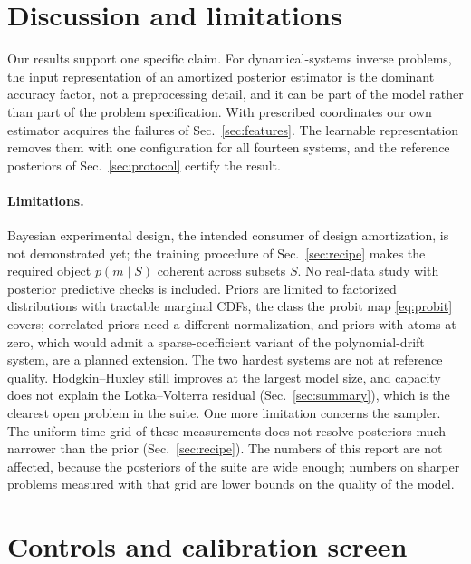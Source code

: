 \documentclass[10pt]{article}
\begin{document}
\section{Discussion and limitations}
\label{sec:discussion}

Our results support one specific claim. For dynamical-systems inverse problems, the input
representation of an amortized posterior estimator is the dominant accuracy factor, not a
preprocessing detail, and it can be part of the model rather than part of the problem specification.
With prescribed coordinates our own estimator acquires the failures of Sec.~\ref{sec:features}. The
learnable representation removes them with one configuration for all fourteen systems, and the
reference posteriors of Sec.~\ref{sec:protocol} certify the result.

\paragraph{Limitations.} Bayesian experimental design, the intended consumer of design amortization,
is not demonstrated yet; the training procedure of Sec.~\ref{sec:recipe} makes the required object
$p(m \mid S)$ coherent across subsets $S$. No real-data study with posterior predictive checks is
included. Priors are limited to factorized distributions with tractable marginal CDFs, the class the
probit map \eqref{eq:probit} covers; correlated priors need a different normalization, and priors with
atoms at zero, which would admit a sparse-coefficient variant of the polynomial-drift system, are a
planned extension. The two hardest systems are not at reference quality. Hodgkin--Huxley still
improves at the largest model size, and capacity does not explain the Lotka--Volterra residual
(Sec.~\ref{sec:summary}), which is the clearest open problem in the suite. One more limitation
concerns the sampler. The uniform time grid of these measurements does not resolve posteriors much
narrower than the prior (Sec.~\ref{sec:recipe}). The numbers of this report are not affected, because
the posteriors of the suite are wide enough; numbers on sharper problems measured with that grid are
lower bounds on the quality of the model.

\appendix

\section{Controls and calibration screen}
\label{app:systems}
\end{document}
